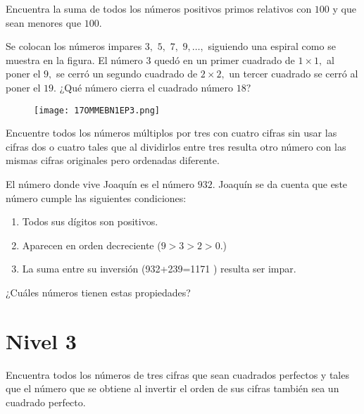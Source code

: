 \begin{problem}[OMMEB 2017]
    Encuentra la suma de todos los números positivos primos 
    relativos con \(100\) y que sean menores que \(100\).
\end{problem}

\begin{problem}[OMMEB 2017]
    Se colocan los números impares \(3,\) \(5,\) \(7,\) 
    \(9,\ldots,\) siguiendo una espiral como se muestra en la 
    figura. El número \(3\) quedó en un primer cuadrado de 
    \(1 \times 1,\) al poner el \(9,\) se cerró un segundo 
    cuadrado de \(2\times 2,\) un tercer cuadrado se cerró al 
    poner el \(19.\) ¿Qué número cierra el cuadrado número \(18?\)
\end{problem}

\begin{figure}[h]
    \centering
    \texttt{[image: 17OMMEBN1EP3.png]}
\end{figure}

\begin{problem}[OMMEB 2017]
    Encuentre todos los números múltiplos por tres con cuatro 
    cifras sin usar las cifras dos o cuatro tales que al 
    dividirlos entre tres resulta otro número con las mismas 
    cifras originales pero ordenadas diferente.
\end{problem}

\begin{problem}[OMMEB 2017]
    El número donde vive Joaquín es el número \(932.\) Joaquín se 
    da cuenta que este número cumple las siguientes condiciones:
   \begin{enumerate}
    \item Todos sus dígitos son positivos.
    \item Aparecen en orden decreciente (\(9 > 3 > 2 >0.\))
    \item La suma entre su inversión (932+239=1171 ) resulta ser impar.
   \end{enumerate}
   ¿Cuáles números tienen estas propiedades?
\end{problem}

\section{Nivel 3}

\begin{problem}[OMMEB 2017]
    Encuentra todos los números de tres cifras que sean 
    cuadrados perfectos y tales que el número que se obtiene 
    al invertir el orden de sus cifras también sea un cuadrado 
    perfecto.
\end{problem}

